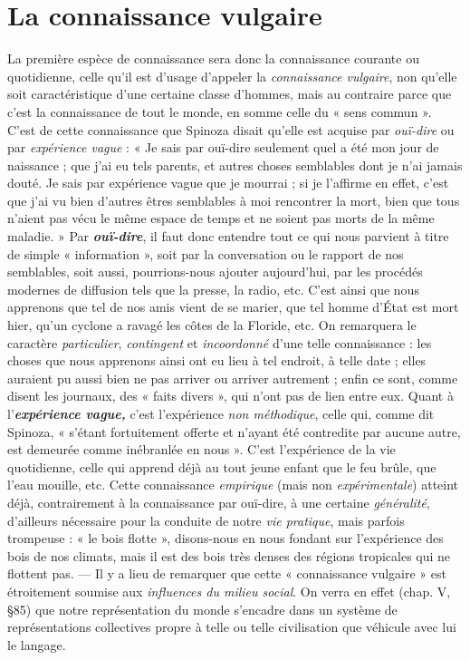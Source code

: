 \section{La connaissance vulgaire}%
La première espèce de connaissance
sera donc la connaissance courante ou quotidienne, celle qu’il
est d’usage d'appeler la {\it connaissance vulgaire}, non qu’elle soit caractéristique
d’une certaine classe d'hommes, mais au contraire parce que
c’est la connaissance de tout le monde, en somme celle du « sens
commun ». C’est de cette connaissance que Spinoza disait qu’elle
est acquise par {\it ouï-dire} ou par {\it expérience vague} : « Je sais par ouï-dire
seulement quel a été mon jour de naissance ; que j'ai eu tels parents,
et autres choses semblables dont je n’ai jamais douté. Je sais par
expérience vague que je mourrai ; si je l’affirme en effet, c’est que j'ai
vu bien d’autres êtres semblables à moi rencontrer la mort, bien que
tous n’aient pas vécu le même espace de temps et ne soient pas morts
de la même maladie. » Par \textbf{\textit {ouï-dire}}, il faut donc entendre tout ce qui
nous parvient à titre de simple « information », soit par la conversation
ou le rapport de nos semblables, soit aussi, pourrions-nous ajouter
aujourd’hui, par les procédés modernes de diffusion tels que la
presse, la radio, etc. C’est ainsi que nous apprenons que tel de nos
amis vient de se marier, que tel homme d'État est mort hier, qu’un
cyclone a ravagé les côtes de la Floride, etc. On remarquera le caractère
{\it particulier}, {\it contingent} et {\it incoordonné} d’une telle connaissance :
les choses que nous apprenons ainsi ont eu lieu à tel endroit, à telle
date ; elles auraient pu aussi bien ne pas arriver ou arriver autrement ;
enfin ce sont, comme disent les journaux, des « faits divers », qui
n’ont pas de lien entre eux. Quant à l'\textbf{\textit {expérience vague,}} c’est l’expérience
{\it non méthodique}, celle qui, comme dit Spinoza, « s’étant fortuitement
offerte et n’ayant été contredite par aucune autre, est demeurée
comme inébranlée en nous ». C’est l’expérience de la vie quotidienne,
celle qui apprend déjà au tout jeune enfant que le feu brûle, que l’eau
mouille, etc. Cette connaissance {\it empirique} (mais non {\it expérimentale})
atteint déjà, contrairement à la connaissance par ouï-dire, à une certaine
{\it généralité}, d’ailleurs nécessaire pour la conduite de notre {\it vie
pratique}, mais parfois trompeuse : « le bois flotte », disons-nous en
nous fondant sur l’expérience des bois de nos climats, mais il est des
bois très denses des régions tropicales qui ne flottent pas. — Il y a
lieu de remarquer que cette « connaissance vulgaire » est étroitement
soumise aux {\it influences du milieu social}. On verra en effet (chap. V,
\S 85) que notre représentation du monde s’encadre dans un système
de représentations collectives propre à telle ou telle civilisation que
véhicule avec lui le langage.

